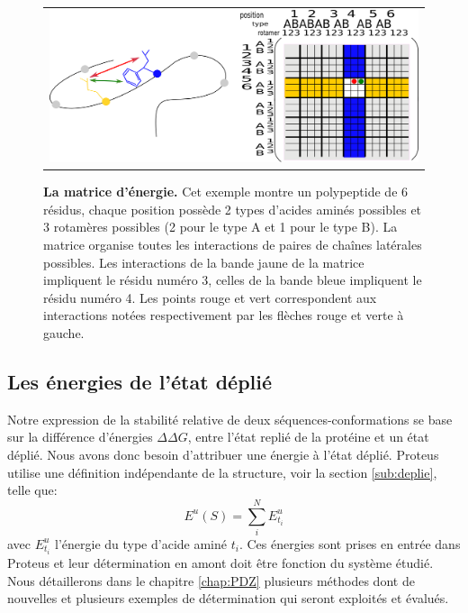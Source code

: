    \begin{figure}[!htbp]
     \centering
     \begin{tabular}{c} 
       \includegraphics[width=15cm]{figure/matrice.png}
       \label{Graph:mat_ener}
     \end{tabular}
     
     \caption{\textbf{La matrice d'énergie.} Cet exemple montre un polypeptide de 6 résidus, chaque position possède 2 types d'acides aminés possibles et 3 rotamères possibles (2 pour le type A et 1 pour le type B). La matrice organise toutes les interactions de paires de chaînes latérales possibles. Les interactions de la bande jaune de la matrice impliquent le résidu numéro 3, celles de la bande bleue impliquent le résidu numéro 4. Les points rouge et vert correspondent aux interactions notées respectivement par les flèches rouge et verte à gauche.}
\label{fig:matener}
   \end{figure}
   
\subsection{Les énergies de l'état déplié}
Notre expression de la stabilité relative de deux séquences-conformations se base sur la différence d'énergies $\Delta \Delta G$, entre l'état replié de la protéine et un état déplié. Nous avons donc besoin d'attribuer une énergie à l'état déplié. Proteus utilise une définition indépendante de la structure, voir la section \vref{sub:deplie}, telle que:
\begin{equation}
E^u(S) = \sum_i^N E^u_{t_i}  
\end{equation}
avec $E^u_{t_i}$ l'énergie du type d'acide aminé $t_i$. Ces énergies sont prises en entrée dans Proteus et leur détermination en amont doit être fonction du système étudié. Nous détaillerons dans le chapitre \ref{chap:PDZ} plusieurs méthodes dont de nouvelles et plusieurs exemples de détermination qui seront exploités et évalués.

